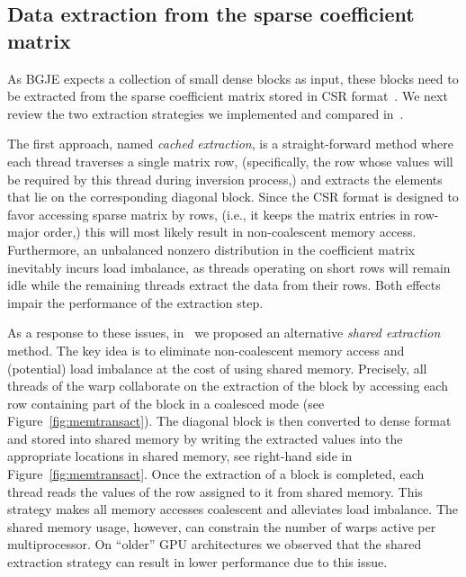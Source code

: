 \subsection{Data extraction from the sparse coefficient matrix}
\label{subsec:s3-extraction}

As BGJE expects a collection of small dense blocks as input,
these blocks need to be extracted from the sparse coefficient matrix
stored in CSR format~\cite{saad}.
We next review the two extraction strategies we implemented and compared 
in~\cite{Anzt:2017:BGE:3026937.3026940}.


The first approach, named {\it cached extraction}, is a straight-forward method
where each thread traverses a single matrix row,
(specifically, the row whose values will be required by this thread during inversion process,)
and extracts the elements that lie on the corresponding diagonal block.
Since the CSR format is designed to favor accessing sparse matrix by rows, 
({i.e., it keeps the matrix entries in row-major order,})
this will most likely result in non-coalescent memory 
access.
Furthermore, an unbalanced nonzero distribution in the coefficient matrix
inevitably incurs load imbalance, as threads operating on short rows will remain idle while the 
remaining threads extract the data from their rows.
Both effects impair the performance of the extraction step.


As a response to these issues, in~\cite{Anzt:2017:BGE:3026937.3026940} we proposed 
an alternative 
{\it shared extraction} method.
The key idea is to eliminate non-coalescent memory access and
(potential) load imbalance at the cost of using shared memory.
Precisely, all threads of the warp collaborate on the extraction of the block
by accessing each row containing part of the block in a coalesced mode
(see Figure~\ref{fig:memtransact}).
The diagonal block is then converted to dense format and stored 
into shared memory by writing the extracted 
values into the appropriate locations in shared memory, see right-hand side  in Figure~\ref{fig:memtransact}.
Once the extraction of a block is completed,
each thread reads the values of the row assigned to it from shared memory.
This strategy makes all memory accesses coalescent
and alleviates load imbalance.
The shared memory usage, however, can constrain
the number of warps active per multiprocessor.
On ``older'' GPU architectures we observed that the shared extraction
strategy can result in lower performance due to this issue.

